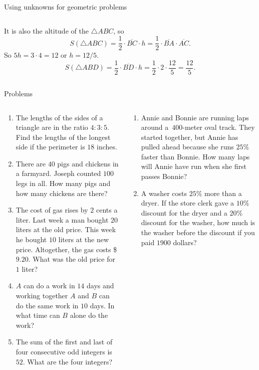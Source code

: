 \documentclass[9pt,aspectratio=169]{beamer}
\begin{document}
\begin{frame}{Using unknowns for geometric problems}
\begin{columns}[T]
\begin{column}{0.5\textwidth}
      It is also the altitude of the $\triangle ABC$, so 
      \[S (\triangle ABC) = \frac{1}{2}\cdot \overline{BC} \cdot h = \frac{1}{2}\cdot \overline{BA} \cdot \overline{AC}. \] 
      So $5h = 3 \cdot 4 = 12$ or $h = 12/5$. 
      \[ S(\triangle ABD) = \frac{1}{2}\cdot \overline{BD} \cdot h = \frac{1}{2}\cdot 2 \cdot \frac{12}{5} = \frac{12}{5}. \]
    \end{column}
  \end{columns}
\end{frame}

\begin{frame}{Problems}
  \begin{columns}[T]
    \begin{column}{0.5\textwidth}
      \begin{enumerate}
        \item The lengths of the sides of a triangle are in the ratio $4:3:5$. Find the lengths of the longest side if the perimeter is $18$ inches.
        \item There are $40$ pigs and chickens in a farmyard. Joseph counted $100$ legs in all. How many pigs and how many chickens are there?
        \item The cost of gas rises by $2$ cents a liter. Last week a man bought $20$ liters at the old price. This week he bought $10$ liters at the new price. Altogether, the gas costs \$$9{.}20$. What was the old price for $1$ liter?
        \item $A$ can do a work in $14$ days and working together $A$ and $B$ can do the same work in $10$ days. In what time can $B$ alone do the work?
        \item The sum of the first and last of four consecutive odd integers is $52.$ What are the four integers?
        \seti
      \end{enumerate}
    \end{column}
    \begin{column}{0.5\textwidth}
      \begin{enumerate}
        \conti
        \item Annie and Bonnie are running laps around a~$400$-meter oval track. They started together, but Annie has pulled ahead because she runs $25\%$ faster than Bonnie. How many laps will Annie have run when she first passes Bonnie?
        \item A washer costs $25\%$ more than a dryer. If the store clerk gave a $10\%$ discount for the dryer and a $20\%$ discount for the washer, how much is the washer before the discount if you paid $1900$ dollars?

\end{enumerate}
\end{column}
\end{columns}
\end{frame}
\end{document}
